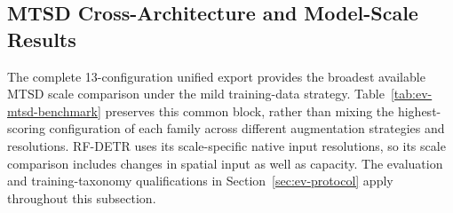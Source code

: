 
\subsection{MTSD Cross-Architecture and Model-Scale Results}
\label{sec:ev-mtsd-supervised}
The complete 13-configuration unified export provides the broadest available \gls{MTSD} scale comparison under the mild training-data strategy. Table~\ref{tab:ev-mtsd-benchmark} preserves this common block, rather than mixing the highest-scoring configuration of each family across different augmentation strategies and resolutions. RF-DETR uses its scale-specific native input resolutions, so its scale comparison includes changes in spatial input as well as capacity. The evaluation and training-taxonomy qualifications in Section~\ref{sec:ev-protocol} apply throughout this subsection.

